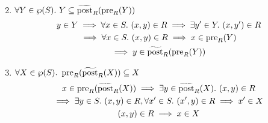 \begin{exercise}
\begin{enumerate}[1.]
\begin{gather*}
        \end{gather*}
        \item $\forall Y \in \wp(S).\ Y \subseteq \widetilde{\operatorname{post}}_R(\operatorname{pre}_R(Y))$
        \begin{gather*}
            y \in Y \implies \forall x \in S.\ (x, y) \in R \implies \exists y' \in Y.\ (x, y') \in R \\
            \implies \forall x \in S.\ (x, y) \in R \implies x \in \operatorname{pre}_R(Y) \\
            \implies y \in \widetilde{\operatorname{post}}_R(\operatorname{pre}_R(Y))
        \end{gather*}
        \item $\forall X \in \wp(S).\ \pre_R(\widetilde{\post}_R(X)) \subseteq X$
        \begin{gather*}
            x \in \pre_R(\widetilde{\post}_R(X)) \implies \exists y \in \widetilde{\post}_R(X).\ (x, y) \in R \\
            \implies \exists y \in S.\ (x, y) \in R, \forall x' \in S.\ (x', y) \in R \implies x' \in X \\
            (x, y) \in R \implies x \in X
        \end{gather*}
    \end{enumerate}
\end{exercise}
